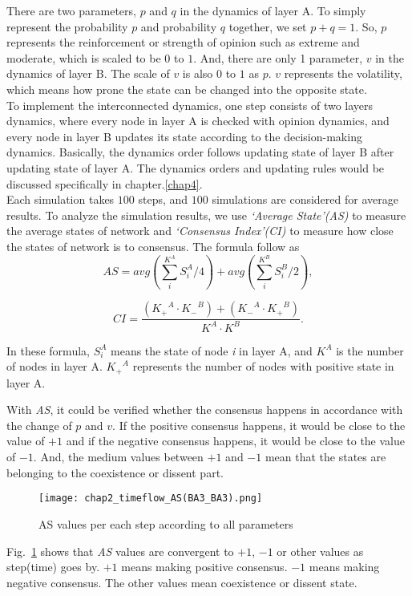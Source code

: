 There are two parameters, $p$ and $q$ in the dynamics of layer A. To simply represent the probability $p$ and probability $q$ together, we set $p+q=1$. So, $p$ represents the reinforcement or strength of opinion such as extreme and moderate, which is scaled to be $0$ to $1$. And, there are only 1 parameter, $v$ in the dynamics of layer B. The scale of $v$ is also $0$ to $1$ as $p$. $v$ represents the volatility, which means how prone the state can be changed into the opposite state.  \\

To implement the interconnected dynamics, one step consists of two layers dynamics, where every node in layer A is checked with opinion dynamics, and every node in layer B updates its state according to the decision-making dynamics. Basically, the dynamics order follows updating state of layer B after updating state of layer A. The dynamics orders and updating rules would be discussed specifically in chapter.\ref{chap4}.  \\    

Each simulation takes $100$ steps, and $100$ simulations are considered for average results. To analyze the simulation results, we use \textit{`Average State'(AS)} to measure the average states of network and \textit{`Consensus Index'(CI)} to measure how close the states of network is to consensus. The formula follow as \\

\begin{equation}
AS = avg\left( {\sum\limits_i^{{K^A}} {S_i^A/4} } \right) + avg\left( {\sum\limits_i^{{K^B}} {S_i^B/2} } \right),
\end{equation}

\begin{equation}
CI = \frac{{({K_ + }^A \cdot {K_ - }^B) + ({K_ - }^A \cdot {K_ + }^B)}}{{{K^A} \cdot {K^B}}}.
\end{equation}

In these formula, $S_i^A$ means the state of node \textit{i} in layer A, and $K^A$ is the number of nodes in layer A. ${K_ + }^A$ represents the number of nodes with positive state in layer A.   

With \textit{AS}, it could be verified whether the consensus happens in accordance with the change of $p$ and $v$.  If the positive consensus happens, it would be close to the value of $+1$ and if the negative consensus happens, it would be close to the value of $-1$. And, the medium values between $+1$ and $-1$ mean that the states are belonging to the coexistence or dissent part.
\begin{figure}[!htb]
	\centering
	\texttt{[image: chap2\_timeflow\_AS(BA3\_BA3).png]}
	\caption{AS values per each step according to all parameters}
	\label{chap2_timeflow_AS(BA3_BA3)}
\end{figure}
Fig.~\ref{chap2_timeflow_AS(BA3_BA3)} shows that \textit{AS} values are convergent to $+1$, $-1$ or other values as step(time) goes by. $+1$ means making positive consensus. $-1$ means making negative consensus. The other values mean coexistence or dissent state. 

